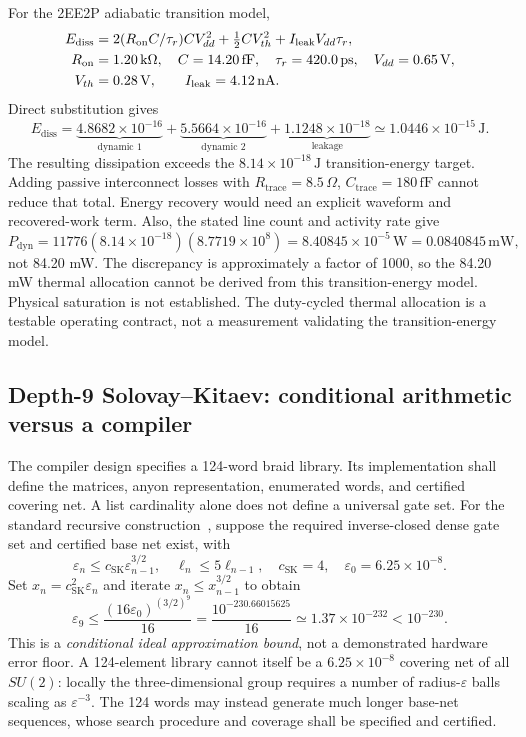 \documentclass[11pt,a4paper]{article}
\newcommand{\unit}[1]{\,\mathrm{#1}}
\begin{document}
For the 2EE2P adiabatic transition model,
\begin{align}
 E_{\mathrm{diss}}&=2(R_{\mathrm{on}}C/\tau_r)CV_{dd}^2
 +\tfrac12 CV_{th}^2+I_{\mathrm{leak}}V_{dd}\tau_r,\\
 R_{\mathrm{on}}&=1.20\unit{k\Omega},\quad C=14.20\unit{fF},\quad
 \tau_r=420.0\unit{ps},\quad V_{dd}=0.65\unit V,\notag\\
 V_{th}&=0.28\unit V,\qquad I_{\mathrm{leak}}=4.12\unit{nA}.\notag
\end{align}
Direct substitution gives
\[
 E_{\mathrm{diss}}=\underbrace{4.8682\times10^{-16}}_{\text{dynamic 1}}
 +\underbrace{5.5664\times10^{-16}}_{\text{dynamic 2}}
 +\underbrace{1.1248\times10^{-18}}_{\text{leakage}}
 \simeq1.0446\times10^{-15}\unit J.
\]
The resulting dissipation exceeds the $8.14\times10^{-18}\unit J$ transition-energy
target. Adding passive interconnect losses with
$R_{\mathrm{trace}}=8.5\,\Omega$, $C_{\mathrm{trace}}=180\unit{fF}$ cannot reduce that total.
Energy recovery would need an explicit waveform and recovered-work term.
Also, the stated line count and activity rate give
\[
 P_{\mathrm{dyn}}=11776(8.14\times10^{-18})(8.7719\times10^8)
 =8.40845\times10^{-5}\unit W=0.0840845\unit{mW},
\]
not 84.20 mW. The discrepancy is approximately a factor of 1000, so the 84.20 mW
thermal allocation cannot be derived from this transition-energy model.
Physical saturation is not established. The duty-cycled thermal allocation is a
testable operating contract, not a measurement validating the transition-energy model.

\subsection{Depth-9 Solovay--Kitaev: conditional arithmetic versus a compiler}
\label{sec:sk9}
The compiler design specifies a 124-word braid library. Its implementation shall define
the matrices, anyon representation, enumerated words, and certified covering net.
A list cardinality alone does not
define a universal gate set. For the standard recursive construction~\cite{sk}, suppose
the required inverse-closed dense gate set and certified base net exist, with
\[
 \varepsilon_n\le c_{\mathrm{SK}}\varepsilon_{n-1}^{3/2},\quad
 \ell_n\le5\ell_{n-1},\quad c_{\mathrm{SK}}=4,\quad\varepsilon_0=6.25\times10^{-8}.
\]
Set $x_n=c_{\mathrm{SK}}^2\varepsilon_n$ and iterate $x_n\le x_{n-1}^{3/2}$ to obtain
\[
 \varepsilon_9\le\frac{(16\varepsilon_0)^{(3/2)^9}}{16}
 =\frac{10^{-230.66015625}}{16}\simeq1.37\times10^{-232}<10^{-230}.
\]
This is a \emph{conditional ideal approximation bound}, not a demonstrated hardware error
floor. A 124-element library cannot itself be a $6.25\times10^{-8}$ covering net of all
$SU(2)$: locally the three-dimensional group requires a number of radius-$\varepsilon$
balls scaling as $\varepsilon^{-3}$. The 124 words may instead generate much longer base-net
sequences, whose search procedure and coverage shall be specified and certified.
\end{document}
